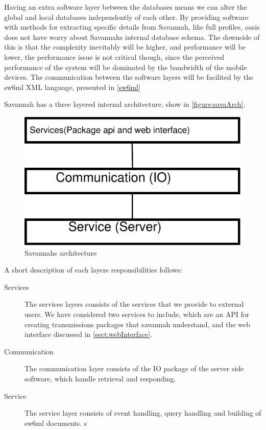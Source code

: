 Having an extra software layer between the databases means we can alter the global and local databases independently of each other. By providing software with methods for extracting specific
details from Savannah, like full profiles, oasis does not have worry about Savannahs internal database schema. The downside of this is that the complexity inevitably will be higher, and performance
will be lower, the performance issue is not critical though, since the perceived performance of the system will be dominated by the bandwidth of the mobile devices. 
The communication between the software layers will be facilited by the sw6ml XML language, presented in \autoref{sw6ml}

Savannah has a three layered internal architecture, show in \autoref{figure:savaArch}.

\begin{figure}[H]
  \centering
    \includegraphics{images/savaArch}
  \caption{Savannahs architecture}
  \label{figure:savaArch}
\end{figure}

A short description of each layers responsibilities follows:

\begin{description}
 \item[Services] The services layers consists of the services that we provide to external users. We have considered two services to include, which are an API for creating transmissions packages	 		that savannah understand, and the web interface discussed in \autoref{sect:webInterface}.
 \item[Communication] The communication layer consists of the IO package of the server side software, which handle retrieval and responding.
 \item[Service] The service layer consists of event handling, query handling and building of sw6ml documents. s
\end{description}


